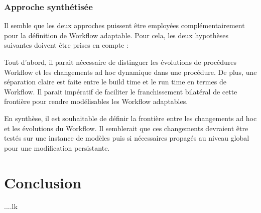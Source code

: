  \subsubsection{ Approche synthétisée}
 Il semble que les deux approches puissent être employées complémentairement pour la définition de Workflow adaptable. Pour cela, les deux hypothèses suivantes doivent être prises en compte :
 
 Tout d’abord, il parait nécessaire de distinguer les évolutions de procédures Workflow et les changements ad hoc dynamique dans une procédure. De plus, une séparation claire est faite entre le build time et le run time en termes de Workflow. Il parait impératif de faciliter le franchissement bilatéral de cette frontière pour rendre modélisables les Workflow adaptables.
 
 En synthèse, il est souhaitable de définir la frontière entre les changements ad hoc et les évolutions du Workflow. Il semblerait que ces changements devraient être testés sur une instance de modèles puis si nécessaires propagés au niveau global pour une modification persistante.
  
\section{Conclusion}
....lk
